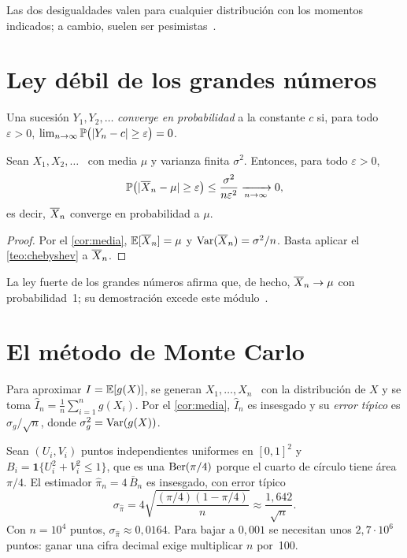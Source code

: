 Las dos desigualdades valen para cualquier distribución con los momentos indicados; a cambio, suelen ser pesimistas~\cite[§5.1]{bt}.

\section{Ley débil de los grandes números}

\begin{definicion}
Una sucesión $Y_1,Y_2,\dots$ \emph{converge en probabilidad} a la constante $c$ si, para todo $\varepsilon>0$, $\lim_{n\to\infty}\mathbb{P}\bigl(\lvert Y_n-c\rvert\ge\varepsilon\bigr)=0$.
\end{definicion}

\begin{teorema}\label{teo:lgn}
Sean $X_1,X_2,\dots$ \iid\ con media $\mu$ y varianza finita $\sigma^{2}$. Entonces, para todo $\varepsilon>0$,
\[
\mathbb{P}\bigl(\lvert\overline{X}_n-\mu\rvert\ge\varepsilon\bigr)\le\frac{\sigma^{2}}{n\varepsilon^{2}}\xrightarrow[n\to\infty]{}0,
\]
es decir, $\overline{X}_n$ converge en probabilidad a $\mu$.
\end{teorema}

\begin{proof}
Por el \cref{cor:media}, $\mathbb{E}[\overline{X}_n]=\mu$ y $\operatorname{Var}(\overline{X}_n)=\sigma^{2}/n$. Basta aplicar el \cref{teo:chebyshev} a $\overline{X}_n$.
\end{proof}

La ley fuerte de los grandes números afirma que, de hecho, $\overline{X}_n\to\mu$ con probabilidad~1; su demostración excede este módulo~\cite[§5.5]{bt}.

\section{El método de Monte Carlo}

\begin{definicion}\label{def:montecarlo}
Para aproximar $I=\mathbb{E}[g(X)]$, se generan $X_1,\dots,X_n$ \iid\ con la distribución de $X$ y se toma $\hat I_n=\frac1n\sum_{i=1}^{n}g(X_i)$. Por el \cref{cor:media}, $\hat I_n$ es insesgado y su \emph{error típico} es $\sigma_g/\sqrt n$, donde $\sigma_g^{2}=\operatorname{Var}(g(X))$.
\end{definicion}

\begin{ejemplo}[Estimación de $\pi$]\label{ej:pi}
Sean $(U_i,V_i)$ puntos independientes uniformes en $[0,1]^{2}$ y $B_i=\mathbf{1}\{U_i^{2}+V_i^{2}\le 1\}$, que es una $\operatorname{Ber}(\pi/4)$ porque el cuarto de círculo tiene área $\pi/4$. El estimador $\hat\pi_n=4\,\overline{B}_n$ es insesgado, con error típico
\[
\sigma_{\hat\pi}=4\sqrt{\frac{(\pi/4)(1-\pi/4)}{n}}\approx\frac{1{,}642}{\sqrt n}.
\]
Con $n=10^{4}$ puntos, $\sigma_{\hat\pi}\approx 0{,}0164$. Para bajar a $0{,}001$ se necesitan unos $2{,}7\cdot 10^{6}$ puntos: ganar una cifra decimal exige multiplicar $n$ por~100.
\end{ejemplo}


